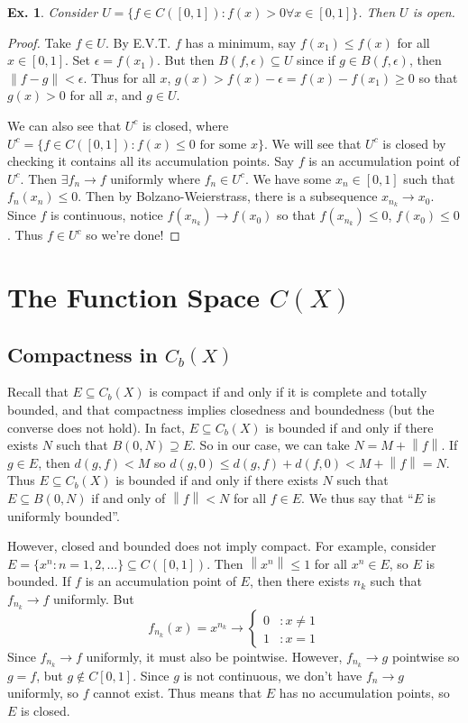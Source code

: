 \documentclass[12pt, a4paper]{book}
\newcommand{\norm}[1]{\left\lVert#1\right\rVert} %
\newtheorem{example}[theorem]{Ex.}
\theoremstyle{nonumberplain}
\newtheorem{proof}{Proof}
\begin{document}
\begin{example}
    Consider $U=\{f\in C([0,1]):f(x)>0\forall x\in[0,1]\}$. Then $U$ is open.
\end{example}
\begin{proof}
    Take $f\in U$.
    By E.V.T. $f$ has a minimum, say $f(x_1)\leq f(x)$ for all $x\in[0,1]$.
    Set $\epsilon=f(x_1)$.
    But then $B(f,\epsilon)\subseteq U$ since if $g\in B(f,\epsilon)$, then $\norm{f-g}<\epsilon$.
    Thus for all $x$, $g(x)>f(x)-\epsilon=f(x)-f(x_1)\geq 0$ so that $g(x)>0$ for all $x$, and $g\in U$.

    We can also see that $U^c$ is closed, where $U^c=\{f\in C([0,1]):\text{$f(x)\leq 0$ for some $x$}\}$.
    We will see that $U^c$ is closed by checking it contains all its accumulation points.
    Say $f$ is an accumulation point of $U^c$.
    Then $\exists f_n\to f$ uniformly where $f_n\in U^c$.
    We have some $x_n\in[0,1]$ such that $f_n(x_n)\leq 0$.
    Then by Bolzano-Weierstrass, there is a subsequence $x_{n_k}\to x_0$.
    Since $f$ is continuous, notice $f(x_{n_k})\to f(x_0)$ so that $f(x_{n_k})\leq 0$, $f(x_0)\leq 0$.
    Thus $f\in U^c$ so we're done!
\end{proof}
\chapter{The Function Space $C(X)$}
\section{Compactness in $C_b(X)$}
Recall that $E\subseteq C_b(X)$ is compact if and only if it is complete and totally bounded, and that compactness implies closedness and boundedness (but the converse does not hold).
In fact, $E\subseteq C_b(X)$ is bounded if and only if there exists $N$ such that $B(0,N)\supseteq E$.
So in our case, we can take $N=M+\norm{f}$.
If $g\in E$, then $d(g,f)<M$ so $d(g,0)\leq d(g,f)+d(f,0)<M+\norm{f}=N$.
Thus $E\subseteq C_b(X)$ is bounded if and only if there exists $N$ such that $E\subseteq B(0,N)$ if and only of $\norm{f}<N$ for all $f\in E$.
We thus say that ``$E$ is uniformly bounded''.

However, closed and bounded does not imply compact.
For example, consider $E=\{x^n:n=1,2,\ldots\}\subseteq C([0,1])$.
Then $\norm{x^n}\leq 1$ for all $x^n\in E$, so $E$ is bounded.
If $f$ is an accumulation point of $E$, then there exists $n_k$ such that $f_{n_k}\to f$ uniformly.
But
\[f_{n_k}(x)=x^{n_k}\to
    \begin{cases}
        0 &:x\neq 1\\
        1 &:x = 1
    \end{cases}
\]
Since $f_{n_k}\to f$ uniformly, it must also be pointwise.
However, $f_{n_k}\to g$ pointwise so $g=f$, but $g\notin C[0,1]$.
Since $g$ is not continuous, we don't have $f_n\to g$ uniformly, so $f$ cannot exist.
Thus means that $E$ has no accumulation points, so $E$ is closed.
\end{document}
